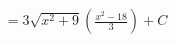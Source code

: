 \documentclass[preview]{standalone}
\begin{document}
\begin{align*}
&=3\sqrt{x^2+9}(\frac{x^2-18}{3})+C \\
\end{align*}
\end{document}
